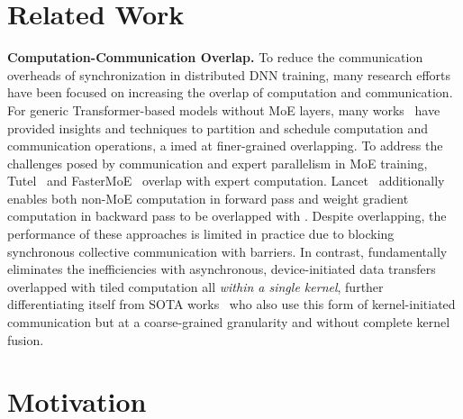 \chapter{Related Work}\label{ch:related-work}
\noindent\textbf{Computation-Communication Overlap.}
To reduce the communication overheads of synchronization in distributed DNN training, many research efforts have been focused on
increasing the overlap of computation and communication.
For generic Transformer-based models without MoE layers,
many works~\cite{coconet,decomposition,centauri,t3,megascale,co2,syndicate,ccfuser,fused}
have provided insights and techniques to
partition and schedule computation and communication operations, a
imed at finer-grained overlapping.
To address the challenges posed by \alltoall communication and
expert parallelism in MoE training, Tutel~\cite{tutel} and FasterMoE~\cite{fastermoe}
overlap \alltoall with expert computation.
Lancet~\cite{lancet} additionally enables both non-MoE computation in
forward pass and weight gradient computation in backward pass to be overlapped with \alltoall.
Despite overlapping, the performance of these approaches is
limited in practice due to blocking synchronous collective communication with barriers.
In contrast, \sysname fundamentally
eliminates the inefficiencies with
asynchronous, device-initiated data transfers overlapped with tiled computation
all \emph{within a single kernel},
further differentiating itself from SOTA works~\cite{triton-dist, comet, deepep}
who also use this form of kernel-initiated communication but at a coarse-grained granularity
and without complete kernel fusion.
\chapter{Motivation}\label{ch:motivation}
